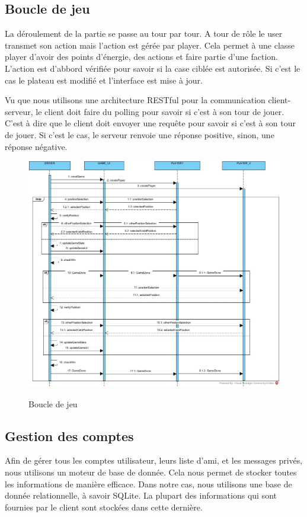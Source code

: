 \documentclass[../design_fonctionnement_sys.tex]{subfiles}
\begin{document}
\subsection{Boucle de jeu}
La déroulement de la partie se passe au tour par tour. A tour de rôle le user transmet son action
mais l'action est gérée par player. Cela permet à une classe player d'avoir des points d'énergie, des actions et faire partie
d'une faction. L'action est d'abbord vérifiée pour savoir si la case ciblée est autorisée. Si c'est le cas le plateau
est modifié et l'interface est mise à jour.

Vu que nous utilisons une architecture RESTful pour la communication client-serveur, le client doit faire du polling pour savoir si c'est à son tour de jouer.
C'est à dire que le client doit envoyer une requête pour savoir si c'est à son tour de jouer. Si c'est le cas, le serveur renvoie une réponse positive, sinon, une réponse négative.

\begin{figure}[H]
    \centering
    \includegraphics[scale=0.3]{img_design/Game.jpg}
    \label{fig:seq_gameloop_client}
    \caption{Boucle de jeu}
\end{figure}

\subsection{Gestion des comptes}
Afin de gérer tous les comptes utilisateur, leurs liste d'ami, et les messages privés, nous utilisons un moteur de base de donnée.
Cela nous permet de stocker toutes les informations de manière efficace. Dans notre cas, nous utilisons une base de donnée relationnelle, à savoir SQLite.
La plupart des informations qui sont fournies par le client sont stockées dans cette dernière.
\end{document}

